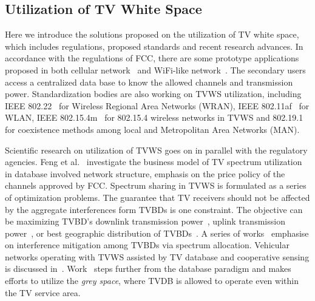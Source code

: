 \documentclass[times]{ettauth}
\theoremstyle{mytheoremstyle}
\theoremstyle{mytheoremstyle}
\theoremstyle{mytheoremstyle}
\begin{document}
\subsection*{Utilization of TV White Space}
Here we introduce the solutions proposed on the utilization of TV white space, which includes regulations, proposed standards and recent research advances.
In accordance with the regulations of FCC, there are some prototype applications proposed in both cellular network~\cite{tvwhite_lte2011, multicell_geo_dyspan11} and WiFi-like network~\cite{whitefi09}.
The secondary users access a centralized data base to know the allowed channels and transmission power.
%
Standardization bodies are also working on TVWS utilization, including IEEE 802.22~\cite{802.22} for Wireless Regional Area Networks (WRAN), IEEE 802.11af~\cite{802.11af} for WLAN, IEEE 802.15.4m~\cite{802.15.4m} for 802.15.4 wireless networks in TVWS and 802.19.1~\cite{802.19} for coexistence methods among local and Metropolitan Area Networks (MAN).


Scientific research on utilization of TVWS goes on in parallel with the regulatory agencies.
Feng et al.~\cite{hybridPricing_tvspace_2014} investigate the business model of TV spectrum utilization in database involved network structure, emphasis on the price policy of the channels approved by FCC.
Spectrum sharing in TVWS is formulated as a series of optimization problems. 
The guarantee that TV receivers should not be affected by the aggregate interferences form TVBDs is one constraint.
The objective can be maximizing TVBD's downlink transmission power~\cite{multipleIntf_pimrc11}, uplink transmission power~\cite{uplink_power_tvws13}, or best geographic distribution of TVBDs~\cite{withinTVcoverage_PIMRC13}.
A series of works~\cite{game_CA_association_ICDCS12,SA_CA_TVWS_2012crowncom, 802.22co-existence09, 802.22game_08globecom,self-coexistenceWRAN2010infocom} emphasise on interference mitigation among TVBDs via spectrum allocation.
Vehicular networks operating with TVWS assisted by TV database and cooperative sensing is discussed in~\cite{tvws_vtc13}.
Work~\cite{increaseTVWS12} steps further from the database paradigm and makes efforts to utilize the \textit{grey space}, where TVDB is allowed to operate even within the TV service area.
\end{document}
